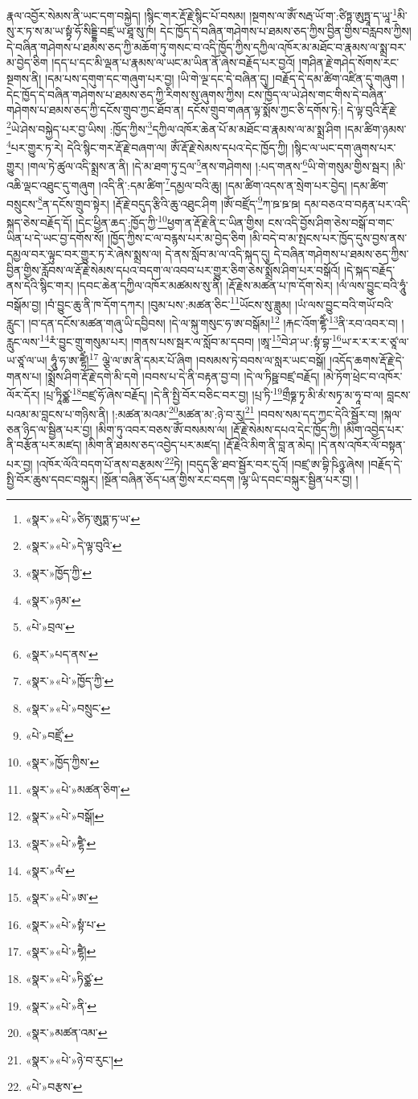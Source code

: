 རྣལ་འབྱོར་སེམས་ནི་ཡང་དག་བསྐྱེད། །སྙིང་གར་རྡོ་རྗེ་སྙིང་པོ་བསམ། །སྔགས་ལ་ཨོཾ་སརྦ་ཡོ་ག་:ཙིཏྟ་ཨུཏྤཱ་ད་ཡཱ་\footnote{«སྣར་»«པེ་»ཙིཏ་ཨུཏྨ་ཏ་ཡ་}མི་སུ་ར་ཏ་ས་མ་ཡ་སྟྭཾ་ཧོ་སིདྡྷི་བཛྲ་ཡ་ཐཱ་སུ་ཁཾ། དེང་ཁྱོད་དེ་བཞིན་གཤེགས་པ་ཐམས་ཅད་ཀྱིས་བྱིན་གྱིས་བརླབས་ཀྱིས། དེ་བཞིན་གཤེགས་པ་ཐམས་ཅད་ཀྱི་མཆོག་ཏུ་གསང་བ་འདི་ཁྱོད་ཀྱིས་དཀྱིལ་འཁོར་མ་མཐོང་བ་རྣམས་ལ་སྨྲ་བར་མ་བྱེད་ཅིག །དད་པ་དང་མི་ལྡན་པ་རྣམས་ལ་ཡང་མ་ཡིན་ནོ་ཞེས་བརྗོད་པར་བྱའོ། །གཤིན་རྗེ་གཤེད་སོགས་རང་སྔགས་ནི། །དམ་པས་དགུག་དང་གཞུག་པར་བྱ། །ཡི་གེ་ལྔ་དང་དེ་བཞིན་དུ། །བརྗོད་དེ་དམ་ཚིག་འཛིན་དུ་གཞུག །དེང་ཁྱོད་དེ་བཞིན་གཤེགས་པ་ཐམས་ཅད་ཀྱི་རིགས་སུ་ཞུགས་ཀྱིས། ངས་ཁྱོད་ལ་ཡེ་ཤེས་གང་གིས་དེ་བཞིན་གཤེགས་པ་ཐམས་ཅད་ཀྱི་དངོས་གྲུབ་ཀྱང་ཐོབ་ན། དངོས་གྲུབ་གཞན་ལྟ་སྨོས་ཀྱང་ཅི་དགོས་ཏེ:། དེ་ལྟ་བུའི་རྡོ་རྗེ་\footnote{«སྣར་»«པེ་»དེ་ལྟ་བུའི་}ཡེ་ཤེས་བསྐྱེད་པར་བྱ་ཡིས། :ཁྱོད་ཀྱིས་\footnote{«སྣར་»ཁྱོད་ཀྱི་}དཀྱིལ་འཁོར་ཆེན་པོ་མ་མཐོང་བ་རྣམས་ལ་མ་སྨྲ་ཤིག །དམ་ཚིག་ཉམས་\footnote{«སྣར་»ཉམ་}པར་གྱུར་ཏ་རེ། དེའི་སྙིང་གར་རྡོ་རྗེ་བཞག་ལ། ཨོཾ་རྡོ་རྗེ་སེམས་དཔའ་དེང་ཁྱོད་ཀྱི། །སྙིང་ལ་ཡང་དག་ཞུགས་པར་གྱུར། །གལ་ཏེ་ཚུལ་འདི་སྨྲས་ན་ནི། །དེ་མ་ཐག་ཏུ་དྲལ་\footnote{«པེ་»བྲལ་}ནས་གཤེགས། །:པད་གནས་\footnote{«སྣར་»པད་ནས་}ཡི་གེ་གསུམ་གྱིས་སྦར། །མི་འཆི་ལྡང་འཐུང་དུ་གཞུག །འདི་ནི་:དམ་ཚིག་\footnote{«སྣར་»«པེ་»ཁྱོད་ཀྱི་}དམྱལ་བའི་ཆུ། །དམ་ཚིག་འདས་ན་སྲེག་པར་བྱེད། །དམ་ཚིག་བསྲུངས་\footnote{«སྣར་»«པེ་»བསྲུང་}ན་དངོས་གྲུབ་སྟེར། །རྡོ་རྗེ་བདུད་རྩིའི་ཆུ་འཐུང་ཤིག །ཨོཾ་བཛྲོད་\footnote{«པེ་»བཛྲོ་}ཀ་ཋ་ཋ་ཋ། དམ་བཅའ་བ་བརྟན་པར་འདི་སྐད་ཅེས་བརྗོད་དོ། །དེང་ཕྱིན་ཆད་:ཁྱོད་ཀྱི་\footnote{«སྣར་»ཁྱོད་ཀྱིས་}ཕྱག་ན་རྡོ་རྗེ་ནི་ང་ཡིན་གྱིས། ངས་འདི་བྱོས་ཤིག་ཅེས་བསྒོ་བ་གང་ཡིན་པ་དེ་ཡང་བྱ་དགོས་སོ། །ཁྱོད་ཀྱིས་ང་ལ་བརྙས་པར་མ་བྱེད་ཅིག །མི་བདེ་བ་མ་སྤངས་པར་ཁྱོད་དུས་བྱས་ནས་དམྱལ་བར་ལྟུང་བར་གྱུར་ཏ་རེ་ཞེས་སྨྲས་ལ། དེ་ནས་སློབ་མ་ལ་འདི་སྐད་དུ། དེ་བཞིན་གཤེགས་པ་ཐམས་ཅད་ཀྱིས་བྱིན་གྱིས་རློབས་ལ་རྡོ་རྗེ་སེམས་དཔའ་བདག་ལ་འབབ་པར་གྱུར་ཅིག་ཅེས་སྨྲོས་ཤིག་པར་བསྒོའོ། །དེ་སྐད་བརྗོད་ནས་དེའི་སྙིང་གར། །དབང་ཆེན་དཀྱིལ་འཁོར་མཚམས་སུ་ནི། །རྡོ་རྗེས་མཚན་པ་ཁ་དོག་སེར། །ལཾ་ལས་བྱུང་བའི་ཧཱུཾ་བསྒོམ་བྱ། །བཾ་བྱུང་ཆུ་ནི་ཁ་དོག་དཀར། །བུམ་པས་:མཚན་ཅིང་\footnote{«སྣར་»«པེ་»མཚན་ཅིག་}ཡོངས་སུ་ཟླུམ། །ཡཾ་ལས་བྱུང་བའི་གཡོ་བའི་རླུང་། །བ་དན་དངོས་མཚན་གཞུ་ཡི་དབྱིབས། །དེ་ལ་སྐུ་གསུང་ཧ་ཨ་བསྒོམ།\footnote{«སྣར་»«པེ་»བསྒོ།} །རྐང་འོག་ཛྷཻཾ་\footnote{«སྣར་»«པེ་»ཛྷཻ་}ནི་རབ་འབར་བ། །རླུང་ལས་\footnote{«སྣར་»ལཾ་}རཾ་བྱུང་གྲུ་གསུམ་པར། །གནས་པས་སྦར་ལ་སློབ་མ་དབབ། །ཨཱ་\footnote{«སྣར་»«པེ་»ཨ་}བེ་ཤ་ཡ་:སྟཾ་བྷ་\footnote{«སྣར་»«པེ་»སྟཾ་པ་}ཡ་ར་ར་ར་ར་ཙཱ་ལ་ཡ་ཙཱ་ལ་ཡ། ཧཱུཾ་ཧ་ཨ་ཛྷཻཾ།\footnote{«སྣར་»«པེ་»ཛྷཻ།} ལྕེ་ལ་ཨ་ནི་དམར་པོ་ཞིག །བསམས་ཏེ་བབས་ལ་སླར་ཡང་བསྒོ། །འདོད་ཆགས་རྡོ་རྗེ་དེ་གནས་པ། །སྨྲོས་ཤིག་རྡོ་རྗེ་དགེ་མི་དགེ །བབས་པ་དེ་ནི་བརྟན་བྱ་བ། །དེ་ལ་ཏིཥྛ་བཛྲ་བརྗོད། །མེ་ཏོག་ཕྲེང་བ་འཁོར་ལོར་དོར། །པྲ་ཏཱིཙྪ་\footnote{«སྣར་»«པེ་»ཏིཙྪ་}བཛྲ་ཧོ་ཞེས་བརྗོད། །དེ་ནི་སྤྱི་བོར་བཅིང་བར་བྱ། །པྲ་ཏི་\footnote{«སྣར་»«པེ་»ནི་}གྲྀཧྞ་ཏྭ་མི་མཾ་སཏྭ་མ་ཧཱ་བ་ལ། བླངས་པའམ་མ་བླངས་པ་གཉིས་ནི། །:མཚན་མའམ་\footnote{«སྣར་»མཚན་འམ་}མཚན་མ་:ཉེ་བ་རུ།\footnote{«སྣར་»«པེ་»ཉེ་བ་རུང་།} །བབས་སམ་དད་ཀྱང་དེའི་སྦྱོར་བ། །སྐལ་ཅན་ཉིད་ལ་སྦྱིན་པར་བྱ། །མིག་ཏུ་འབར་བཅས་ཨོཾ་བསམས་ལ། །རྡོ་རྗེ་སེམས་དཔའ་དེང་ཁྱོད་ཀྱི། །མིག་འབྱེད་པར་ནི་བརྩོན་པར་མཛད། །མིག་ནི་ཐམས་ཅད་འབྱེད་པར་མཛད། །རྡོ་རྗེའི་མིག་ནི་བླ་ན་མེད། །དེ་ནས་འཁོར་ལོ་བསྟན་པར་བྱ། །འཁོར་ལོའི་བདག་པོ་ནས་བརྩམས་\footnote{«པེ་»བརྩས་}ཏེ། །བདུད་རྩི་ཐབ་སྦྱོར་བར་དུའོ། །བཛྲ་ཨ་བྷི་ཥིཉྩ་ཞེས། །བརྗོད་དེ་སྤྱི་བོར་ཆུས་དབང་བསྐུར། །སྔོན་བཞིན་ཅོད་པན་གྱིས་རང་བདག །ལྷ་ཡི་དབང་བསྐུར་སྦྱིན་པར་བྱ། །
